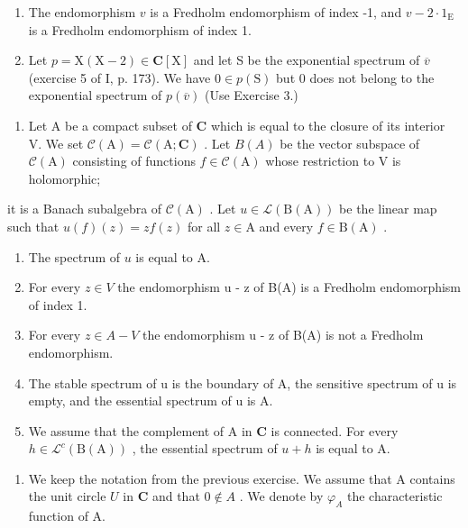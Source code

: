 \begin{enumerate}
\def\labelenumi{\alph{enumi})}
\item
  The endomorphism \(v\) is a Fredholm endomorphism of index -1, and \(v - 2 \cdot 1_{\mathrm{E}}\) is a Fredholm endomorphism of index 1.
\item
  Let \(p = \mathrm{X}(\mathrm{X} - 2) \in \mathbf{C}[\mathrm{X}]\) and let S be the exponential spectrum of \(\overline{v}\) (exercise 5 of I, p. 173). We have \(0 \in p(\mathrm{S})\) but 0 does not belong to the exponential spectrum of \(p(\overline{v})\) (Use Exercise 3.)
\end{enumerate}

\exercisesection{}

\begin{enumerate}
\def\labelenumi{\arabic{enumi})}
\tightlist
\item
  Let A be a compact subset of \(\mathbf{C}\) which is equal to the closure of its interior V. We set \(\mathcal{C}(\mathrm{A}) = \mathcal{C}(\mathrm{A};\mathbf{C})\) . Let \(B(A)\) be the vector subspace of \(\mathcal{C}(\mathrm{A})\) consisting of functions \(f\in \mathcal{C}(\mathrm{A})\) whose restriction to V is holomorphic;
\end{enumerate}

it is a Banach subalgebra of \(\mathcal{C}(\mathrm{A})\) . Let \(u \in \mathcal{L}(\mathrm{B}(\mathrm{A}))\) be the linear map such that \(u(f)(z) = zf(z)\) for all \(z \in \mathrm{A}\) and every \(f \in \mathrm{B}(\mathrm{A})\) .

\begin{enumerate}
\def\labelenumi{\alph{enumi})}
\item
  The spectrum of \(u\) is equal to A.
\item
  For every \(z \in V\) the endomorphism u - z of B(A) is a Fredholm endomorphism of index 1.
\item
  For every \(z \in A - V\) the endomorphism u - z of B(A) is not a Fredholm endomorphism.
\item
  The stable spectrum of u is the boundary of A, the sensitive spectrum of u is empty, and the essential spectrum of u is A.
\item
  We assume that the complement of A in \(\mathbf{C}\) is connected. For every \(h \in \mathcal{L}^{c}(\mathrm{B}(\mathrm{A}))\) , the essential spectrum of \(u + h\) is equal to A.
\end{enumerate}

\begin{enumerate}
\def\labelenumi{\arabic{enumi})}
\setcounter{enumi}{1}
\tightlist
\item
  We keep the notation from the previous exercise. We assume that A contains the unit circle \(U\) in \(\mathbf{C}\) and that \(0 \notin A\) . We denote by \(\varphi_{A}\) the characteristic function of A.
\end{enumerate}

